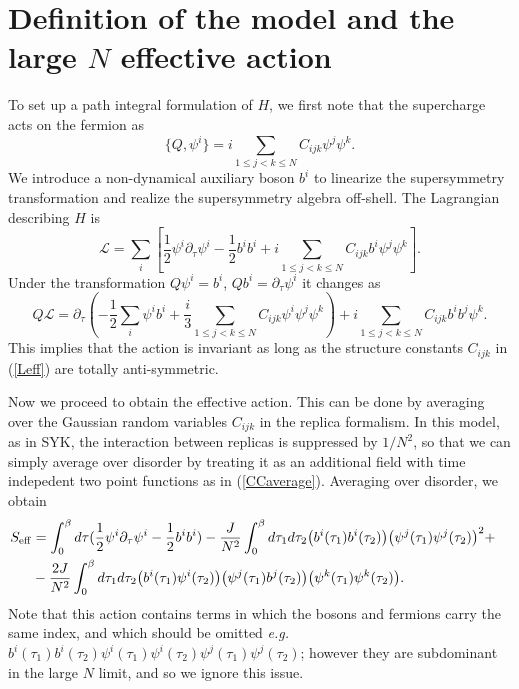\documentclass[aps,pre,preprint,onecolumn,citeautoscript,superscriptaddress,nofootinbib,eqsecnum]{revtex4-1}
\newcommand{\beq}{\begin{equation}}
\newcommand{\eeq}{\end{equation}}
\def\nref#1{(\ref{#1})}
\def\la{\label}
\begin{document}
\section{Definition of the model and the large $N$ effective action}
\label{sec:eff}

To set up a path integral formulation of $H$, we first note that the supercharge acts on the fermion as
\beq
\{Q,\psi^i\}=i \sum_{1\leqslant j<k\leqslant N} C_{ijk}\psi^j\psi^k .
\eeq
We introduce a non-dynamical auxiliary boson $b^i$ to linearize the supersymmetry transformation and realize the supersymmetry algebra off-shell. The Lagrangian
describing $H$ is 
\beq
\mathcal{L}=\sum_i \left[ \frac{1}{2}\psi^i\partial_{\tau}\psi^i-\frac{1}{2}  b^ib^i+ i  \sum_{1\leqslant j<k\leqslant N}C_{ijk}b^i\psi^j\psi^k \right] .\label{Leff}
\eeq
Under the transformation $Q \psi^i = b^i$, $Q  b^i =  \partial_\tau \psi^i$ it changes as 
\beq
Q \mathcal{L}=\partial_{\tau}\left( - \frac{1}{2}  \sum_i\psi^i b^i + \frac{i}{3} \sum_{1\leqslant j<k\leqslant N}C_{ijk}\psi^i\psi^j\psi^k\right) + i \sum_{1\leqslant j<k\leqslant N}C_{ijk}b^i b^j\psi^k .\label{Leffch}
\eeq
This implies that the action is invariant as long as the structure constants $C_{ijk}$ in \nref{Leff} are totally anti-symmetric. 

Now we proceed to obtain the effective action. This can be done by averaging over the 
Gaussian random variables $C_{ijk}$ in the replica formalism. In this model, as in SYK, the interaction between replicas is suppressed by $1/N^2$, so that 
we can simply average over disorder by treating it as an additional field with time indepedent two point functions as in \nref{CCaverage}. 
Averaging over disorder, we obtain
\begin{align} \la{FerAct}
S_{\rm eff}&=\int_0^\beta d\tau (\frac{1}{2}\psi ^i\partial_\tau\psi ^i-\frac{1}{2}b^i b^i )-\frac{J }{N^2}\int_0^\beta d\tau_1 d\tau_2 \big(b^i (\tau_1)b^i (\tau_2)\big)\big(\psi^j (\tau_1)\psi^j (\tau_2)\big)^2 +\cr
&-\frac{2J }{N^2}\int_0^\beta d\tau_1 d\tau_2 \big(b^i (\tau_1)\psi^i (\tau_2)\big)\big(\psi^j (\tau_1)b^j (\tau_2)\big)\big(\psi^k (\tau_1)\psi^k (\tau_2)\big) .
\end{align}
Note that this action contains terms in which the bosons and fermions carry the same index, and which should be omitted \textit{e.g.} $b^i (\tau_1)b^i (\tau_2)\psi^i (\tau_1)\psi^i (\tau_2)\psi^j (\tau_1)\psi^j (\tau_2)$;
however they are subdominant in the large $N$ limit, and so we  ignore this issue.
\end{document}

